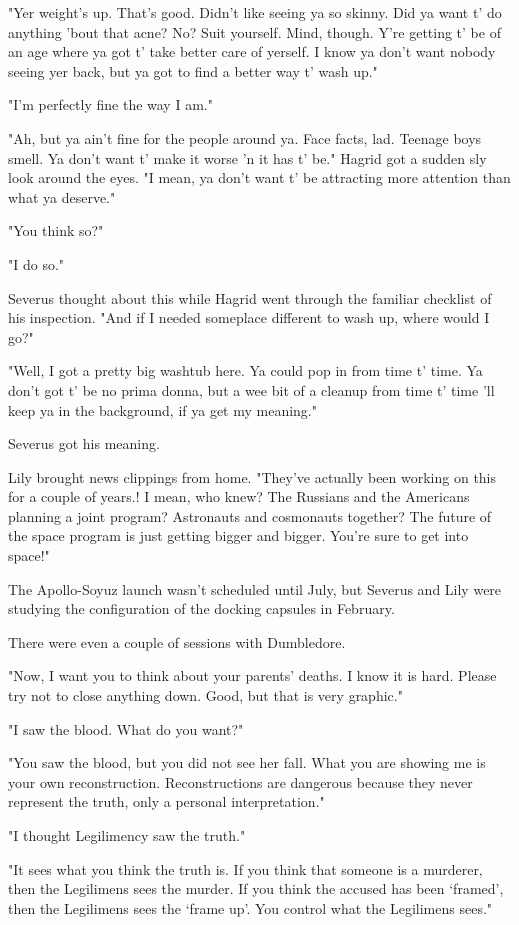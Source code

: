 \documentclass[a4paper,11pt]{article}
\begin{document}
"Yer weight's up. That's good. Didn't like seeing ya so skinny. Did ya want t' do anything 'bout that acne? No? Suit yourself. Mind, though. Y're getting t' be of an age where ya got t' take better care of yerself. I know ya don't want nobody seeing yer back, but ya got to find a better way t' wash up."

"I'm perfectly fine the way I am."

"Ah, but ya ain't fine for the people around ya. Face facts, lad. Teenage boys smell. Ya don't want t' make it worse 'n it has t' be." Hagrid got a sudden sly look around the eyes. "I mean, ya don't want t' be attracting more attention than what ya deserve."

"You think so?"

"I do so."

Severus thought about this while Hagrid went through the familiar checklist of his inspection. "And if I needed someplace different to wash up, where would I go?"

"Well, I got a pretty big washtub here. Ya could pop in from time t' time. Ya don't got t' be no prima donna, but a wee bit of a cleanup from time t' time 'll keep ya in the background, if ya get my meaning."

Severus got his meaning.

Lily brought news clippings from home. "They've actually been working on this for a couple of years.! I mean, who knew? The Russians and the Americans planning a joint program? Astronauts and cosmonauts together? The future of the space program is just getting bigger and bigger. You're sure to get into space!"

The Apollo-Soyuz launch wasn't scheduled until July, but Severus and Lily were studying the configuration of the docking capsules in February.

There were even a couple of sessions with Dumbledore.

"Now, I want you to think about your parents' deaths. I know it is hard. Please try not to close anything down. Good, but that is very graphic."

"I saw the blood. What do you want?"

"You saw the blood, but you did not see her fall. What you are showing me is your own reconstruction. Reconstructions are dangerous because they never represent the truth, only a personal interpretation."

"I thought Legilimency saw the truth."

"It sees what you think the truth is. If you think that someone is a murderer, then the Legilimens sees the murder. If you think the accused has been `framed', then the Legilimens sees the `frame up'. You control what the Legilimens sees."
\end{document}
